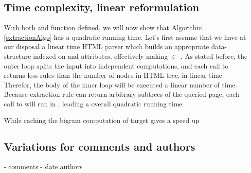 \similarityAlgo

\subsection{Time complexity, linear reformulation}

With both  and  function defined, we will now show that Algorithm \ref{extractionAlgo} has a quadratic running time. Let's first assume that we have at our disposal a linear time HTML parser which builds an appropriate data-structure indexed on  and  attributes, effectively making  $\in$ . As stated before, the outer loop splits the input into independent computations, and each call to  returns less rules than the number of nodes in HTML tree, in linear time. Therefor, the body of the inner loop will be executed a linear number of time. Because extraction rule can return arbitrary subtrees of the queried page, each call to  will run in , leading a overall quadratic running time.

While caching the bigram computation of target gives a speed up








\subsection{Variations for comments and authors}
- comments
- date authors
